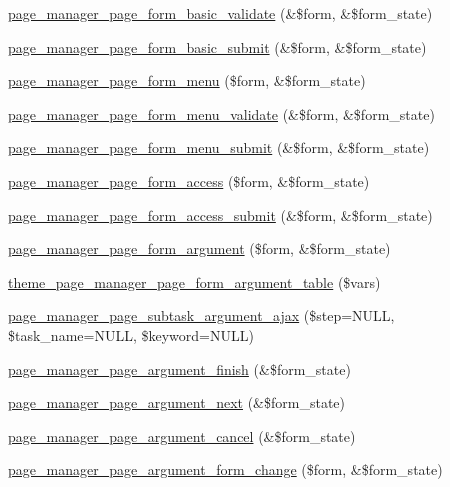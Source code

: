 \begin{DoxyCompactItemize}
\item 
\hyperlink{page_8admin_8inc_a07e14f2811aa3135e2f53d9c044a1bcc}{page\_\-manager\_\-page\_\-form\_\-basic\_\-validate} (\&\$form, \&\$form\_\-state)
\item 
\hyperlink{page_8admin_8inc_a576b9e7683f6f4d8dd2bef833a16c8b9}{page\_\-manager\_\-page\_\-form\_\-basic\_\-submit} (\&\$form, \&\$form\_\-state)
\item 
\hyperlink{page_8admin_8inc_a97c1e9b03b6b308a3aeaea9e98da2cb6}{page\_\-manager\_\-page\_\-form\_\-menu} (\$form, \&\$form\_\-state)
\item 
\hyperlink{page_8admin_8inc_af53e1248d62ab656dce705747d9c4523}{page\_\-manager\_\-page\_\-form\_\-menu\_\-validate} (\&\$form, \&\$form\_\-state)
\item 
\hyperlink{page_8admin_8inc_ac33beb928f40fba9cbfe4f02851ce9db}{page\_\-manager\_\-page\_\-form\_\-menu\_\-submit} (\&\$form, \&\$form\_\-state)
\item 
\hyperlink{page_8admin_8inc_ac5237c0d37758abd050164f7cbf5bc21}{page\_\-manager\_\-page\_\-form\_\-access} (\$form, \&\$form\_\-state)
\item 
\hyperlink{page_8admin_8inc_a7d39660f9cfbc37989482d7e6beea141}{page\_\-manager\_\-page\_\-form\_\-access\_\-submit} (\&\$form, \&\$form\_\-state)
\item 
\hyperlink{page_8admin_8inc_a1ebb3c182dfee149f62fe0d590791129}{page\_\-manager\_\-page\_\-form\_\-argument} (\$form, \&\$form\_\-state)
\item 
\hyperlink{page_8admin_8inc_a05df2ed3370fd03d5b411e1cf9fdbd69}{theme\_\-page\_\-manager\_\-page\_\-form\_\-argument\_\-table} (\$vars)
\item 
\hyperlink{page_8admin_8inc_a7efab6e6f23dbf0808f9a3fcfb644464}{page\_\-manager\_\-page\_\-subtask\_\-argument\_\-ajax} (\$step=NULL, \$task\_\-name=NULL, \$keyword=NULL)
\item 
\hyperlink{page_8admin_8inc_a93088fa7edaa49c603cad9ef9d4d02af}{page\_\-manager\_\-page\_\-argument\_\-finish} (\&\$form\_\-state)
\item 
\hyperlink{page_8admin_8inc_ac0fd0f2e4848540bcdea083954d17a0e}{page\_\-manager\_\-page\_\-argument\_\-next} (\&\$form\_\-state)
\item 
\hyperlink{page_8admin_8inc_a7a8694f4f7b039a730ea806acaa82ba6}{page\_\-manager\_\-page\_\-argument\_\-cancel} (\&\$form\_\-state)
\item 
\hyperlink{page_8admin_8inc_a7ebf1de1b34d0110ce2074bce752e3ff}{page\_\-manager\_\-page\_\-argument\_\-form\_\-change} (\$form, \&\$form\_\-state)

\end{DoxyCompactItemize}
